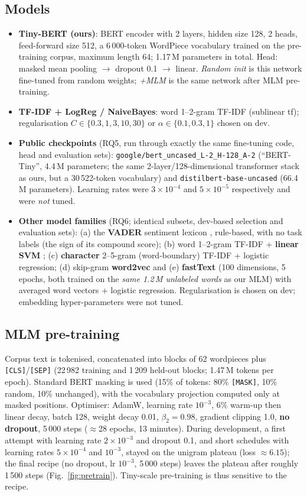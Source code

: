 \documentclass[11pt,a4paper]{article}
\begin{document}
\subsection{Models}
\begin{itemize}
\item \textbf{Tiny-BERT (ours)}: BERT encoder with 2 layers, hidden size 128, 2 heads, feed-forward size 512, a 6\,000-token WordPiece vocabulary trained on the pre-training corpus, maximum length 64; 1.17\,M parameters in total. Head: masked mean pooling $\rightarrow$ dropout 0.1 $\rightarrow$ linear.
\emph{Random init} is this network fine-tuned from random weights; \emph{+MLM} is the same network after MLM pre-training.
\item \textbf{TF-IDF + LogReg / NaiveBayes}: word 1--2-gram TF-IDF (sublinear tf); regularisation $C\in\{0.3,1,3,10,30\}$ or $\alpha\in\{0.1,0.3,1\}$ chosen on dev.
\item \textbf{Public checkpoints} (RQ5, run through exactly the same fine-tuning code, head and evaluation sets): \texttt{google/bert\_uncased\_L-2\_H-128\_A-2} (``BERT-Tiny'', 4.4\,M parameters; the same 2-layer/128-dimensional transformer stack as ours, but a 30\,522-token vocabulary) and \texttt{distilbert-base-uncased} (66.4\,M parameters). Learning rates were $3\times10^{-4}$ and $5\times10^{-5}$ respectively and were \emph{not} tuned.
\item \textbf{Other model families} (RQ6; identical subsets, dev-based selection and evaluation sets): (a) the \textbf{VADER} sentiment lexicon \cite{hutto2014vader}, rule-based, with no task labels (the sign of its compound score); (b) word 1--2-gram TF-IDF + \textbf{linear SVM} \cite{cortes1995support}; (c) \textbf{character} 2--5-gram (word-boundary) TF-IDF + logistic regression; (d) skip-gram \textbf{word2vec} and (e) \textbf{fastText} (100 dimensions, 5 epochs, both trained on the \emph{same 1.2\,M unlabeled words} as our MLM) with averaged word vectors + logistic regression. Regularisation is chosen on dev; embedding hyper-parameters were not tuned.
\end{itemize}

\subsection{MLM pre-training}
Corpus text is tokenised, concatenated into blocks of 62 wordpieces plus \texttt{[CLS]}/\texttt{[SEP]} (22\,982 training and 1\,209 held-out blocks; 1.47\,M tokens per epoch).
Standard BERT masking is used (15\% of tokens: 80\% \texttt{[MASK]}, 10\% random, 10\% unchanged), with the vocabulary projection computed only at masked positions.
Optimiser: AdamW, learning rate $10^{-3}$, 6\% warm-up then linear decay, batch 128, weight decay 0.01, $\beta_2{=}0.98$, gradient clipping 1.0, \textbf{no dropout}, 5\,000 steps ($\approx$28 epochs, 13 minutes).
During development, a first attempt with learning rate $2\times10^{-3}$ and dropout 0.1, and short schedules with learning rates $5\times10^{-4}$ and $10^{-3}$, stayed on the unigram plateau (loss $\approx6.15$);
the final recipe (no dropout, lr $10^{-3}$, 5\,000 steps) leaves the plateau after roughly 1\,500 steps (Fig.~\ref{fig:pretrain}). Tiny-scale pre-training is thus sensitive to the recipe.
\end{document}
